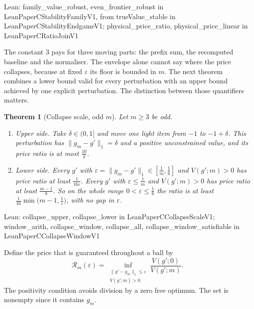 \documentclass[conference]{IEEEtran}
\newtheorem{theorem}{Theorem}
\theoremstyle{definition}
\newcommand{\lean}[1]{\textsf{\footnotesize #1}}
\newcommand{\leanbox}[1]{%
  \par\vspace{2pt}\noindent
  {\raggedright\footnotesize\textsf{Lean: #1}\par}\vspace{2pt}}
\begin{document}
\leanbox{\lean{family\_value\_robust}, \lean{even\_frontier\_robust} in
\lean{LeanPaperCStabilityFamilyV1}, from \lean{trueValue\_stable} in
\lean{LeanPaperCStabilityEndgameV1}; \lean{physical\_price\_ratio}, \lean{physical\_price\_linear}
in \lean{LeanPaperCRatioJoinV1}}

The constant $3$ pays for three moving parts: the prefix sum, the recomputed baseline and the
normaliser. The envelope alone cannot say where the price collapses, because at fixed
$\varepsilon$ its floor is bounded in $m$. The next theorem combines a lower bound valid for every perturbation with an upper bound
achieved by one explicit perturbation. The distinction between those quantifiers matters.

\begin{theorem}[Collapse scale, odd $m$]
\label{thm:collapse}
Let $m\ge3$ be odd.
\begin{enumerate}
\item[(a)] \emph{Upper side.} Take $\delta\in(0,1]$ and move one light item from $-1$ to
$-1+\delta$. This perturbation has $\|g_{m}-g'\|_{1}=\delta$ and a positive unconstrained
value, and its price ratio is at most $\frac{10}{\delta}$.
\item[(b)] \emph{Lower side.} Every $g'$ with $\varepsilon=\|g_{m}-g'\|_{1}\in[\frac1m,\frac16]$
and $V(g';m)>0$ has price ratio at least $\frac{1}{16\varepsilon}$. Every $g'$ with
$\varepsilon\le\frac1m$ and $V(g';m)>0$ has price ratio at least $\frac{m-1}{8}$. So on the
whole range $0<\varepsilon\le\frac16$ the ratio is at least
$\frac1{16}\min\bigl(m-1,\frac1\varepsilon\bigr)$, with no gap in $\varepsilon$.
\end{enumerate}
\end{theorem}

\leanbox{\lean{collapse\_upper}, \lean{collapse\_lower} in \lean{LeanPaperCCollapseScaleV1};
\lean{window\_arith}, \lean{collapse\_window}, \lean{collapse\_all},
\lean{collapse\_window\_satisfiable} in \lean{LeanPaperCCollapseWindowV1}}

Define the price that is guaranteed throughout a ball by
\begin{equation}
\mathcal R_m(\varepsilon)=
\inf_{\substack{\|g'-g_m\|_1\le\varepsilon\\V(g';m)>0}}
\frac{V(g';0)}{V(g';m)}.
\label{eq:robustball}
\end{equation}
The positivity condition avoids division by a zero free optimum. The set is nonempty since
it contains $g_m$.
\end{document}
